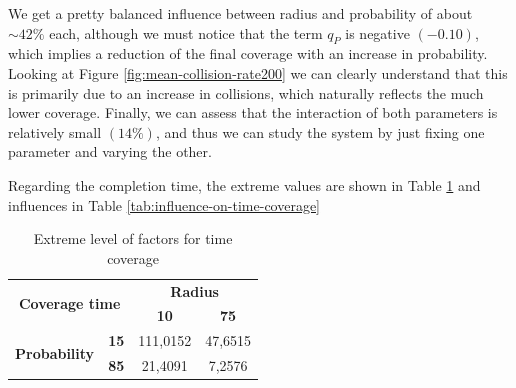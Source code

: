 We get a pretty balanced influence between radius and probability of about $\sim 42\%$ each, although we must notice that the term $q_P$ is negative $(-0.10)$, which implies a reduction of the final coverage with an increase in probability. Looking at Figure \ref{fig:mean-collision-rate200} we can clearly understand that this is primarily due to an increase in collisions, which naturally reflects the much lower coverage. Finally, we can assess that the interaction of both parameters is relatively small $(14\%)$, and thus we can study the system by just fixing one parameter and varying the other.

Regarding the completion time, the extreme values are shown in Table \ref{tab:extreme-factors-time-coverage} and influences in Table \ref{tab:influence-on-time-coverage}

\begin{table}[h!]
\centering
\begin{tabular}{|cc|cc|}
\hline
\multicolumn{2}{|c|}{\multirow{2}{*}{\textbf{Coverage time}}} & \multicolumn{2}{c|}{\textbf{Radius}} \\ \cline{3-4} 
\multicolumn{2}{|c|}{} & \multicolumn{1}{c|}{\textbf{10}} & \textbf{75} \\ \hline
\multicolumn{1}{|c|}{\multirow{2}{*}{\textbf{Probability}}} & \textbf{15} & \multicolumn{1}{c|}{111,0152} & 47,6515 \\ \cline{2-4} 
\multicolumn{1}{|c|}{} & \textbf{85} & \multicolumn{1}{c|}{21,4091} & 7,2576 \\ \hline
\end{tabular}
\caption{Extreme level of factors for time coverage}
\label{tab:extreme-factors-time-coverage}
\end{table}

